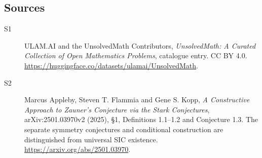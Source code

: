 \documentclass[11pt]{article}
\begin{document}
\subsection{Sources}
\begin{description}
\item[\hypertarget{source:statement:1}{S1}] ULAM.AI and the UnsolvedMath Contributors, \emph{UnsolvedMath: A Curated Collection of Open Mathematics Problems}, catalogue entry. CC BY 4.0. \url{https://huggingface.co/datasets/ulamai/UnsolvedMath}.
\item[\hypertarget{source:statement:2}{S2}] Marcus Appleby, Steven T. Flammia and Gene S. Kopp, \emph{A Constructive Approach to Zauner’s Conjecture via the Stark Conjectures}, arXiv:2501.03970v2 (2025), §1, Definitions 1.1--1.2 and Conjecture 1.3. The separate symmetry conjectures and conditional construction are distinguished from universal SIC existence. \url{https://arxiv.org/abs/2501.03970}.
\end{description}
\label{end:statement}
\end{document}
